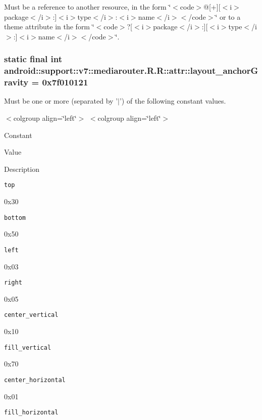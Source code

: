 Must be a reference to another resource, in the form \char`\"{}$<$code$>$@\mbox{[}+\mbox{]}\mbox{[}$<$i$>$package$<$/i$>$:\mbox{]}$<$i$>$type$<$/i$>$:$<$i$>$name$<$/i$>$$<$/code$>$\char`\"{} or to a theme attribute in the form \char`\"{}$<$code$>$?\mbox{[}$<$i$>$package$<$/i$>$:\mbox{]}\mbox{[}$<$i$>$type$<$/i$>$:\mbox{]}$<$i$>$name$<$/i$>$$<$/code$>$\char`\"{}. \hypertarget{classandroid_1_1support_1_1v7_1_1mediarouter_1_1_r_1_1attr_1a69f8bb53538cc3ee1f48555fcd0a2d}{
\subsubsection[{layout\_\-anchorGravity}]{\setlength{\rightskip}{0pt plus 5cm}static final int android::support::v7::mediarouter.R.R::attr::layout\_\-anchorGravity = 0x7f010121}}
\label{classandroid_1_1support_1_1v7_1_1mediarouter_1_1_r_1_1attr_1a69f8bb53538cc3ee1f48555fcd0a2d}


Must be one or more (separated by '$|$') of the following constant values. \begin{TabularC}{0}
\hline
\end{TabularC}
$<$colgroup align=\char`\"{}left\char`\"{}$>$ $<$colgroup align=\char`\"{}left\char`\"{}$>$ 

Constant

Value

Description 

{\tt top}

0x30

{\tt bottom}

0x50

{\tt left}

0x03

{\tt right}

0x05

{\tt center\_\-vertical}

0x10

{\tt fill\_\-vertical}

0x70

{\tt center\_\-horizontal}

0x01

{\tt fill\_\-horizontal}


